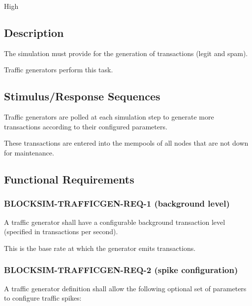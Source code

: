 \documentclass{scrreprt}
\begin{document}
High

\subsection{Description}

The simulation must provide for the generation of transactions (legit and spam).

Traffic generators perform this task.


\subsection{Stimulus/Response Sequences}

Traffic generators are polled at each simulation step to generate more
transactions according to their configured parameters.

These transactions are entered into the mempools of all nodes that are not
down for maintenance.


\subsection{Functional Requirements}

\subsubsection{BLOCKSIM-TRAFFICGEN-REQ-1 (background level)}

A traffic generator shall have a configurable background transaction level
(specified in transactions per second).

This is the base rate at which the generator emits transactions.

\subsubsection{BLOCKSIM-TRAFFICGEN-REQ-2 (spike configuration)}

A traffic generator definition shall allow the following optional set of parameters to configure
traffic spikes:
\end{document}
